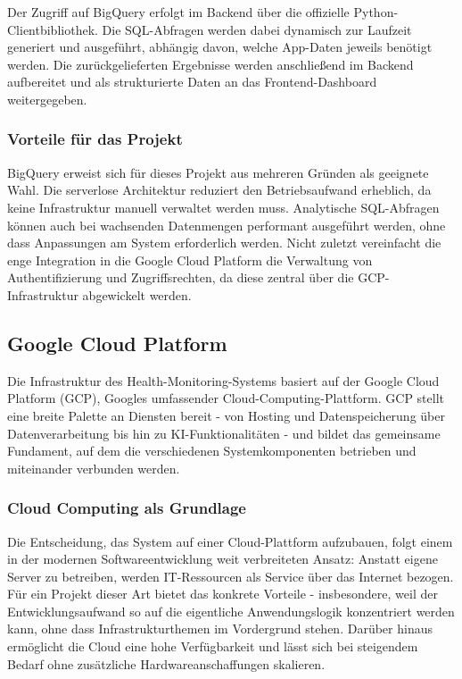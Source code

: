Der Zugriff auf BigQuery erfolgt im Backend über die offizielle Python-Clientbibliothek. Die SQL-Abfragen werden dabei dynamisch zur Laufzeit generiert und ausgeführt, abhängig davon, welche App-Daten jeweils benötigt werden. Die zurückgelieferten Ergebnisse werden anschließend im Backend aufbereitet und als strukturierte Daten an das Frontend-Dashboard weitergegeben.

\subsubsection{Vorteile für das Projekt}
BigQuery erweist sich für dieses Projekt aus mehreren Gründen als geeignete Wahl. Die serverlose Architektur reduziert den Betriebsaufwand erheblich, da keine Infrastruktur manuell verwaltet werden muss. Analytische SQL-Abfragen können auch bei wachsenden Datenmengen performant ausgeführt werden, ohne dass Anpassungen am System erforderlich werden. Nicht zuletzt vereinfacht die enge Integration in die Google Cloud Platform die Verwaltung von Authentifizierung und Zugriffsrechten, da diese zentral über die GCP-Infrastruktur abgewickelt werden.


\subsection{Google Cloud Platform}
Die Infrastruktur des Health-Monitoring-Systems basiert auf der Google Cloud Platform (GCP), Googles umfassender Cloud-Computing-Plattform. GCP stellt eine breite Palette an Diensten bereit - von Hosting und Datenspeicherung über Datenverarbeitung bis hin zu KI-Funktionalitäten - und bildet das gemeinsame Fundament, auf dem die verschiedenen Systemkomponenten betrieben und miteinander verbunden werden. \cite{gcp_docs}

\subsubsection{Cloud Computing als Grundlage}
Die Entscheidung, das System auf einer Cloud-Plattform aufzubauen, folgt einem in der modernen Softwareentwicklung weit verbreiteten Ansatz: Anstatt eigene Server zu betreiben, werden IT-Ressourcen als Service über das Internet bezogen. \cite{cloud_nist} Für ein Projekt dieser Art bietet das konkrete Vorteile - insbesondere, weil der Entwicklungsaufwand so auf die eigentliche Anwendungslogik konzentriert werden kann, ohne dass Infrastrukturthemen im Vordergrund stehen. Darüber hinaus ermöglicht die Cloud eine hohe Verfügbarkeit und lässt sich bei steigendem Bedarf ohne zusätzliche Hardwareanschaffungen skalieren.

